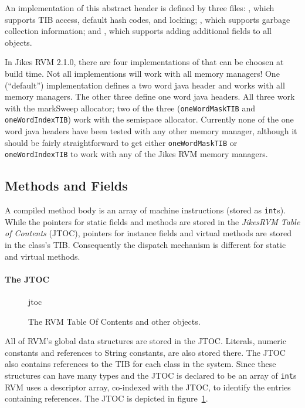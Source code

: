 An implementation of this abstract header is defined by three files: 
, which supports
TIB access, default hash codes, and locking; 
, which
supports garbage collection information; 
and 
, which supports
adding additional fields to all objects. 

In Jikes RVM 2.1.0, there are four implementations of 
 that can be
choosen at build time.  Not all implementions will work with all memory
managers!  One (``default'') implementation defines a two word java
header and works with all memory managers. The other three define one
word java headers.  All three work with the markSweep allocator; two
of the three ({\tt oneWordMaskTIB} and {\tt oneWordIndexTIB}) work
with the semispace allocator.  Currently none of the one word java
headers have been tested with any other memory manager, although it should
be fairly straightforward to get either {\tt oneWordMaskTIB} or {\tt
oneWordIndexTIB} to work with any of the Jikes RVM memory managers. 

\JavaTMFooter

\subsection{Methods and Fields}\label{sssec:methods}
A compiled method body is an array of machine instructions (stored as
{\tt int}s). 
While the pointers for static fields and methods are stored in the 
{\em JikesRVM Table of Contents} (JTOC),
pointers for instance fields and virtual methods are stored in the class's TIB.
Consequently the dispatch mechanism is different for static and virtual 
methods.

\paragraph{The JTOC}
\begin{figure}[htb]
\begin{gif}{jtoc}
\vbox{
\hbox{}
}\hfil
\end{gif}
\caption{The RVM Table Of Contents and other objects.}
\label{fig:jtoc}
\end{figure}
All of RVM's global data structures are stored in the JTOC. 
Literals, numeric
constants and references to String constants, are also stored there.
The JTOC also
contains references to the TIB for each class in the system.  
Since these 
structures can have many types and the JTOC is declared to be an array of 
{\tt int}s  
RVM uses a descriptor array, co-indexed with the JTOC, 
to identify the entries containing references.
The JTOC
is depicted in figure~\ref{fig:jtoc}.  

